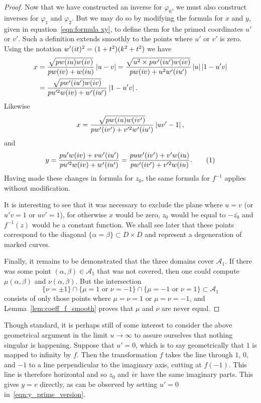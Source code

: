 \begin{lem}
\begin{proof}
Now that we have constructed an inverse for $φ_0$, we must also construct inverses for $φ_1$ and $φ_2$. But we may do so by modifying the formula for $x$ and $y$, given in equation~\eqref{eqn:formula xy}, to define them for the primed coordinates $u'$ or $v'$. Such a definition extends smoothly to the points where $u'$ or $v'$ is zero. Using the notation $w'(i t)^2 = (1+t^2)(k^2 + t^2)$ we have
\begin{align*}
x
&= \frac{\sqrt{pw(i u)w(i v)}}{pw(i v) + w(i u)} \left|u-v\right|
= \frac{\sqrt{u^2 \times pw'(i u')w(i v)}}{pw(i v) + u^2 w'(i u')} \left|u\right|\left|1-u'v\right| \\
&= \frac{\sqrt{pw'(i u')w(i v)}}{pu'^2w(i v) + w'(i u')} \left|1-u'v\right|.
\end{align*}
Likewise
\[
x
= \frac{\sqrt{pw(i u)w(i v')}}{pw'(i v') + v'^2w'(i u')} \left|uv'-1\right|,
\]
and
\[
y
= \frac{pu'w(\iu v) + vw'(\iu u')}{pu'^2w(\iu v) + w'(\iu u')}
= \frac{puw'(\iu v') + v'w(\iu u)}{pw'(\iu v') + v'^2w(\iu u)}. \labelthis{eqn:y_prime_version}
\]
Having made these changes in formula for $z_0$, the same formula for $f^{-1}$ applies without modification.

It is interesting to see that it was necessary to exclude the plane where $u=v$ (or $u'v=1$ or $uv'=1$), for otherwise $x$ would be zero, $z_0$ would be equal to $-\bar{z_0}$ and $f^{-1}(z)$ would be a constant function. We shall see later that these points correspond to the diagonal $\{α=β\} \subset D\times D$ and represent a degeneration of marked curves.

Finally, it remains to be demonstrated that the three domains cover $\mathcal{A}_1$. If there was some point $(α,β) \in \mathcal{A}_1$ that was not covered, then one could compute $μ(α,β)$ and $ν(α,β)$. But the intersection
\[
\{ν = \pm 1\}
\cap \{μ = 1 \text{ or } ν = -1 \}
\cap \{μ = -1 \text{ or } ν = 1 \} \subset \mathcal{A}_1
\]
consists of only those points where $μ=ν=1$ or $μ=ν=-1$, and Lemma~\ref{lem:coeff_f_smooth} proves that $μ$ and $ν$ are never equal.
\end{proof}
\end{lem}

Though standard, it is perhaps still of some interest to consider the above geometrical argument in the limit $u\to\infty$ to assure ourselves that nothing singular is happening. Suppose that $u' = 0$, which is to say geometrically that $1$ is mapped to infinity by $f$. Then the transformation $f$ takes the line through $1$, $0$, and $-1$ to a line perpendicular to the imaginary axis, cutting at $f(-1)$. This line is therefore horizontal and so $z_0$ and $i v$ have the same imaginary parts. This gives $y=v$ directly, as can be observed by setting $u'=0$ in~\eqref{eqn:y_prime_version}.

